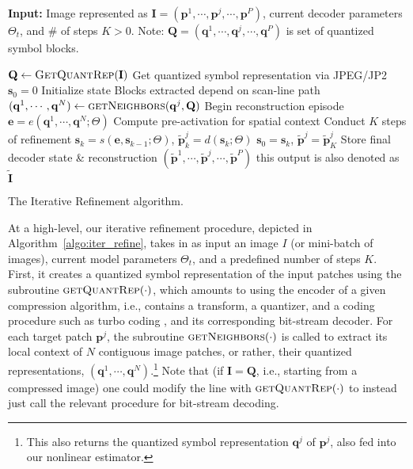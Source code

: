 \documentclass[smallabstract,smallcaptions]{dccpaper}
\begin{document}
\begin{algorithm*}[t]
\begin{algorithmic}
\State \textbf{Input:} Image represented as $\mathbf{I} = (\mathbf{p}^1, \cdots, \mathbf{p}^j, \cdots, \mathbf{p}^P)$, current decoder parameters $\Theta_{t}$, and \# of steps $K > 0$. Note: $\mathbf{Q} = (\mathbf{q}^1, \cdots, \mathbf{q}^j, \cdots, \mathbf{q}^P)$ is set of quantized symbol blocks. %

	\State $\mathbf{Q} \leftarrow \Call{GetQuantRep}{\mathbf{I}}$ \Comment Get quantized symbol representation via JPEG/JP2
    \State $\mathbf{s}_0 = 0$ \Comment Initialize state
	 \Comment Blocks extracted depend on scan-line path
    	\State $(\mathbf{q}^1, \cdots, \mathbf{q}^N) \leftarrow \Call{getNeighbors}{\mathbf{q}^j, \mathbf{Q}}$
        \LineComment Begin reconstruction episode
        \State $\mathbf{e} = e( \mathbf{q}^1, \cdots, \mathbf{q}^N ; \Theta)$ \Comment Compute pre-activation for spatial context
         \Comment Conduct $K$ steps of refinement
        	\State $\mathbf{s}_k = s(\mathbf{e}, \mathbf{s}_{k-1} ; \Theta)$, $\widetilde{\mathbf{p}}^j_k = d(\mathbf{s}_k ; \Theta)$
        \EndFor
        \State $\mathbf{s}_0 = \mathbf{s}_k$, $\widetilde{\mathbf{p}}^j = \widetilde{\mathbf{p}}^j_K$ \Comment Store final decoder state \& reconstruction
	\EndFor
	\State \Return $(\widetilde{\mathbf{p}}^1, \cdots, \widetilde{\mathbf{p}}^j, \cdots, \widetilde{\mathbf{p}}^P)$ \Comment this output is also denoted as $\widetilde{\mathbf{I}}$
\EndFunction

\end{algorithmic}
\caption{The Iterative Refinement algorithm.}
\label{algo:iter_refine}
\end{algorithm*}

At a high-level, our iterative refinement procedure, depicted in Algorithm~\ref{algo:iter_refine}, takes in as input an image $I$ (or mini-batch of images), current model parameters $\Theta_t$, and a predefined number of steps $K$. First, it creates a quantized symbol representation of the input patches using the subroutine $\Call{getQuantRep}{\cdot}$, which amounts to using the encoder of a given compression algorithm, i.e., contains a transform, a quantizer, and a coding procedure such as turbo coding \cite{mitran2002turbo}, and its corresponding bit-stream decoder. For each target patch $\mathbf{p}^j$, the subroutine $\Call{getNeighbors}{\cdot}$ is called to extract its local context of $N$ contiguous image patches, or rather, their quantized representations, $(\mathbf{q}^1, \cdots, \mathbf{q}^N)$.\footnote{This also returns the quantized symbol representation $\mathbf{q}^j$ of $\mathbf{p}^j$, also fed into our nonlinear estimator.} Note that (if $\mathbf{I} = \mathbf{Q}$, i.e., starting from a compressed image) one could modify the line with $\Call{getQuantRep}{\cdot}$ to instead just call the relevant procedure for bit-stream decoding. %
\end{document}
